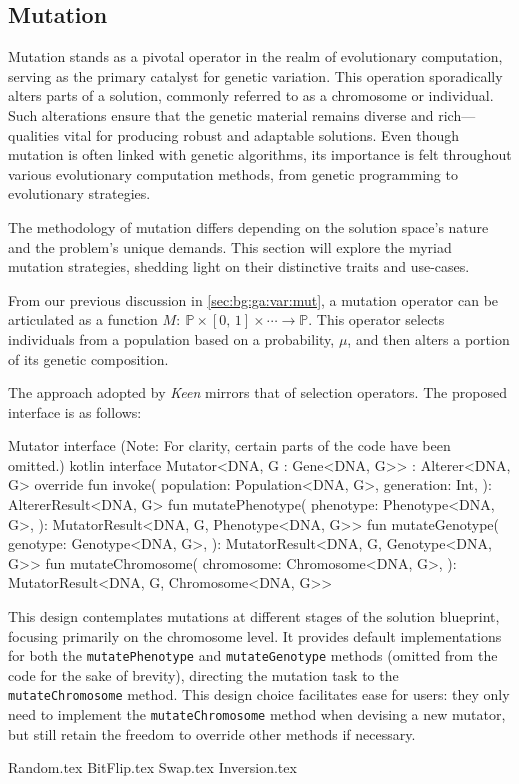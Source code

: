 \subsection{Mutation}
\label{sec:keen:op:mut}
  Mutation stands as a pivotal operator in the realm of evolutionary 
  computation, serving as the primary catalyst for genetic variation.
  This operation sporadically alters parts of a solution, commonly referred to 
  as a chromosome or individual. Such alterations ensure that the genetic 
  material remains diverse and rich—qualities vital for producing robust and 
  adaptable solutions. Even though mutation is often linked with genetic 
  algorithms, its importance is felt throughout various evolutionary 
  computation methods, from genetic programming to evolutionary strategies.

  The methodology of mutation differs depending on the solution space's nature 
  and the problem's unique demands. This section will explore the myriad 
  mutation strategies, shedding light on their distinctive traits and use-cases.

  From our previous discussion in \vref{sec:bg:ga:var:mut}, a mutation operator 
  can be articulated as a function \(M :\: \mathbb{P} \times [0,\, 1] \times 
  \cdots \to \mathbb{P}\). This operator selects individuals from a population 
  based on a probability, \(\mu\), and then alters a portion of its genetic 
  composition.

  The approach adopted by \textit{Keen} mirrors that of selection operators. 
  The proposed interface is as follows:

  \begin{code}{
      Mutator interface (Note: For clarity, certain parts of the code have been omitted.)
    }{}{kotlin}
      interface Mutator<DNA, G : Gene<DNA, G>> : Alterer<DNA, G> {
          override fun invoke(
              population: Population<DNA, G>,
              generation: Int,
          ): AltererResult<DNA, G>
          fun mutatePhenotype(
              phenotype: Phenotype<DNA, G>,
          ): MutatorResult<DNA, G, Phenotype<DNA, G>>
          fun mutateGenotype(
              genotype: Genotype<DNA, G>,
          ): MutatorResult<DNA, G, Genotype<DNA, G>>
          fun mutateChromosome(
              chromosome: Chromosome<DNA, G>,
          ): MutatorResult<DNA, G, Chromosome<DNA, G>>
      }
    \end{code}

  This design contemplates mutations at different stages of the solution 
  blueprint, focusing primarily on the chromosome level. It provides default 
  implementations for both the \texttt{mutatePhenotype} and 
  \texttt{mutateGenotype} methods (omitted from the code for the sake of 
  brevity), directing the mutation task to the \texttt{mutateChromosome} 
  method. This design choice facilitates ease for users: they only need to 
  implement the \texttt{mutateChromosome} method when devising a new mutator, 
  but still retain the freedom to override other methods if necessary.

  {Random.tex}
  {BitFlip.tex}
  {Swap.tex}
  {Inversion.tex}
